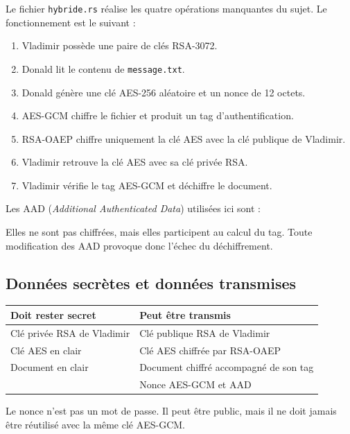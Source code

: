 \documentclass[11pt,a4paper]{article}
\newcommand{\fichier}[1]{\texttt{#1}}
\begin{document}
Le fichier \fichier{hybride.rs} réalise les quatre opérations manquantes du sujet.
Le fonctionnement est le suivant :

\begin{enumerate}
    \item Vladimir possède une paire de clés RSA-3072.
    \item Donald lit le contenu de \fichier{message.txt}.
    \item Donald génère une clé AES-256 aléatoire et un nonce de 12 octets.
    \item AES-GCM chiffre le fichier et produit un tag d'authentification.
    \item RSA-OAEP chiffre uniquement la clé AES avec la clé publique de Vladimir.
    \item Vladimir retrouve la clé AES avec sa clé privée RSA.
    \item Vladimir vérifie le tag AES-GCM et déchiffre le document.
\end{enumerate}

Les AAD (\emph{Additional Authenticated Data}) utilisées ici sont :
\begin{center}
\end{center}
Elles ne sont pas chiffrées,
mais elles participent au calcul du tag. Toute modification des AAD provoque donc
l'échec du déchiffrement.

\subsection{Données secrètes et données transmises}

\begin{table}[h]
\centering
\begin{tabularx}{\textwidth}{p{4.5cm}X}
\toprule
\textbf{Doit rester secret} & \textbf{Peut être transmis} \\
\midrule
Clé privée RSA de Vladimir & Clé publique RSA de Vladimir \\
Clé AES en clair & Clé AES chiffrée par RSA-OAEP \\
Document en clair & Document chiffré accompagné de son tag \\
 & Nonce AES-GCM et AAD \\
\bottomrule
\end{tabularx}
\end{table}

Le nonce n'est pas un mot de passe. Il peut être public, mais il ne doit jamais être
réutilisé avec la même clé AES-GCM.
\end{document}
